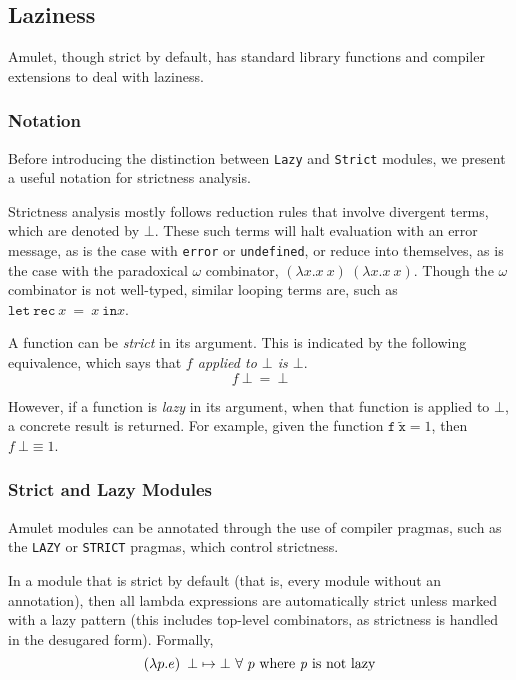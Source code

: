 \subsection{Laziness}

Amulet, though strict by default, has standard library functions and compiler extensions to deal with laziness.

\subsubsection{Notation}

Before introducing the distinction between \texttt{Lazy} and \texttt{Strict} modules, we present a useful notation for
strictness analysis.

Strictness analysis mostly follows reduction rules that involve divergent terms, which are denoted by $\bot$. These such
terms will halt evaluation with an error message, as is the case with \texttt{error} or \texttt{undefined}, or reduce
into themselves, as is the case with the paradoxical $\omega$ combinator, $\left(\lambda{x}.x\ x\right)\
\left(\lambda{x}.x\ x\right)$. Though the $\omega$ combinator is not well-typed, similar looping terms are, such as
$\mathtt{let\ rec}\ x\ =\ x\ \mathtt{in} x$.

A function can be \textit{strict} in its argument. This is indicated by the following equivalence, which says that
\textit{$f$ applied to $\bot$ is $\bot$}.
\[
f\ \bot\ =\ \bot
\]

However, if a function is \textit{lazy} in its argument, when that function is applied to $\bot$, a concrete result is
returned. For example, given the function $\mathtt{f\ \tilde{x}} = 1$, then $f\ \bot \equiv 1$.

\subsubsection{Strict and Lazy Modules}

Amulet modules can be annotated through the use of compiler pragmas, such as the \texttt{LAZY} or \texttt{STRICT}
pragmas, which control strictness.

In a module that is strict by default (that is, every module without an annotation), then all lambda expressions are
automatically strict unless marked with a lazy pattern (this includes top-level combinators, as strictness is handled in
the desugared form). Formally,
\[
  \left(\lambda{p}. e\right)\ \bot \mapsto \bot\ \forall\ p\ \text{where \textit{p} is not lazy}
\]

